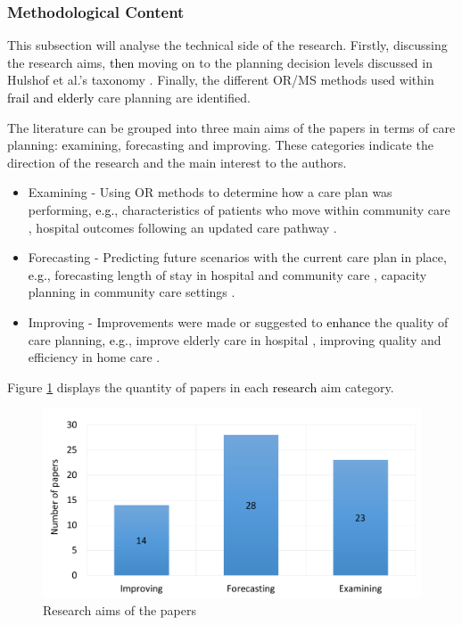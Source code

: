\documentclass[../thesis.tex]{subfiles}
\begin{document}
\subsubsection{Methodological Content}
This subsection will analyse the technical side of the research. Firstly\textcolor{black}{,} discussing the research aims, \textcolor{black}{then} moving on to the planning decision levels discussed in Hulshof et al.'s taxonomy \cite{PHulshof}. Finally, the different OR/MS methods used within \textcolor{black}{frail and elderly} care planning are identified.

The literature can be grouped into three main aims of the papers in terms of care planning: \textcolor{black}{e}xamining, forecasting and improving. These categories indicate the direction of the research and the main interest to the authors. 

\begin{itemize}
    \item Examining - Using OR methods to determine how a care plan was performing\textcolor{black}{, e.g.}, characteristics of patients who move within community care \cite{Gassoumis}, hospital outcomes following an updated care pathway \cite{Wallace}.
    \item Forecasting - Predicting future scenarios with the current care plan in place\textcolor{black}{, e.g.}, forecasting length of stay in hospital and community care \cite{Gordon2}, capacity planning in community care settings \cite{Bidhandi}.
    \item Improving - Improvements were made or suggested to \textcolor{black}{enhance} the quality of care planning\textcolor{black}{, e.g.}, improve elderly care in hospital \cite{Ragab}, improving quality and efficiency in home care \cite{Eveborn}.
\end{itemize}

Figure \ref{fig:Aims} displays the quantity of papers in each \textcolor{black}{research} aim category.

\begin{figure}[H]
\centering
    \includegraphics[scale = 0.3]{Chapter2/Figures/Focus1.pdf}
   \caption{Research aims of the papers}
   \label{fig:Aims}
\end{figure}
\end{document}
